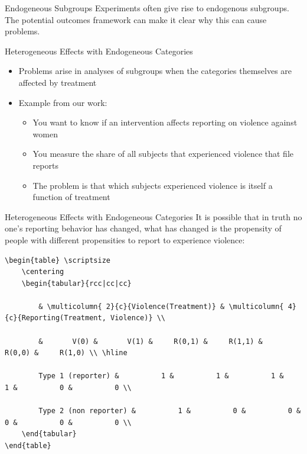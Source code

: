 \documentclass[
  11pt,
  ignorenonframetext,
]{beamer}
\providecommand{\tightlist}{%
  \setlength{\itemsep}{0pt}\setlength{\parskip}{0pt}}\usepackage{longtable,booktabs,array}
\begin{document}
\begin{frame}{Endogeneous Subgroups}
\protect\hypertarget{endogeneous-subgroups-1}{}
Experiments often give rise to endogenous subgroups. The potential
outcomes framework can make it clear why this can cause problems.
\end{frame}

\begin{frame}{Heterogeneous Effects with Endogeneous Categories}
\protect\hypertarget{heterogeneous-effects-with-endogeneous-categories}{}
\begin{itemize}
\item
  Problems arise in analyses of subgroups when the categories themselves
  are affected by treatment
\item
  Example from our work:

  \begin{itemize}
  \tightlist
  \item
    You want to know if an intervention affects reporting on violence
    against women
  \item
    You measure the share of all subjects that experienced violence that
    file reports
  \item
    The problem is that which subjects experienced violence is itself a
    function of treatment
  \end{itemize}
\end{itemize}
\end{frame}

\begin{frame}[fragile]{Heterogeneous Effects with Endogeneous
Categories}
\protect\hypertarget{heterogeneous-effects-with-endogeneous-categories-1}{}
It is possible that in truth no one's reporting behavior has changed,
what has changed is the propensity of people with different propensities
to report to experience violence:

\begin{verbatim}
\begin{table} \scriptsize
    \centering
    \begin{tabular}{rcc|cc|cc}
        
        & \multicolumn{ 2}{c}{Violence(Treatment)} & \multicolumn{ 4}{c}{Reporting(Treatment, Violence)} \\
        
        &       V(0) &       V(1) &     R(0,1) &     R(1,1) &     R(0,0) &     R(1,0) \\ \hline
        
        Type 1 (reporter) &          1 &          1 &          1 &          1 &          0 &          0 \\
        
        Type 2 (non reporter) &          1 &          0 &          0 &          0 &          0 &          0 \\          
    \end{tabular}  
\end{table}
\end{verbatim}
\end{frame}
\end{document}
